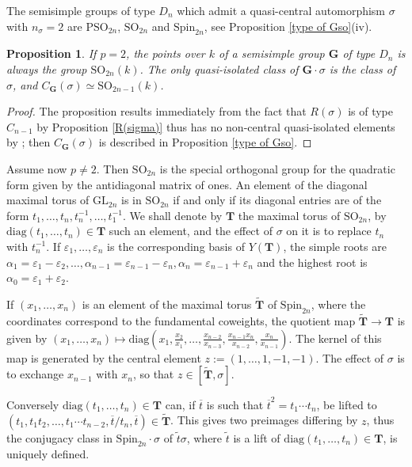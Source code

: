 \documentclass{amsart}
\newtheorem{proposition}[equation]{Proposition}
\numberwithin{equation}{section}
\theoremstyle{definition}
\theoremstyle{remark}
\newcommand\bG{{\mathbf G}}
\newcommand\bT{{\mathbf T}}
\newcommand\ve{{\varepsilon}}
\newcommand\inv{^{-1}}
\newcommand\GL{\mathrm{GL}}
\newcommand\PSO{\mathrm{PSO}}
\newcommand\SO{\mathrm{SO}}
\newcommand\Spin{\mathrm{Spin}}
\newcommand\diag{\mathrm{diag}}
\begin{document}
The semisimple groups of type $D_n$ which admit a quasi-central automorphism
$\sigma$ with $n_\sigma=2$ are $\PSO_{2n}$, $\SO_{2n}$ and $\Spin_{2n}$, see
Proposition \ref{type of Gso}(iv). 

\begin{proposition}
If $p=2$, the points over $k$ of a semisimple group $\bG$ of type $D_n$ is
always 
the group $\SO_{2n}(k)$. The only quasi-isolated class of $\bG\cdot\sigma$ is
the class of $\sigma$, and $C_\bG(\sigma)\simeq \SO_{2n-1}(k)$.
\end{proposition}
\begin{proof} The proposition results immediately from the fact that
$R(\sigma)$ is of type $C_{n-1}$ by Proposition \ref{R(sigma)} thus has no non-central
quasi-isolated elements by \cite[5.B.2]{cedric}; then $C_\bG(\sigma)$ is
described in Proposition \ref{type of Gso}.
\end{proof}

Assume now $p\neq2$. Then
$\SO_{2n}$ is the special orthogonal group for the quadratic form
given by the antidiagonal matrix of ones. An element of the diagonal maximal
torus of $\GL_{2n}$ is in $\SO_{2n}$ if and only if its diagonal entries
are of the form $t_1,\ldots,t_n,t_n\inv,\ldots,t_1\inv$. We shall denote by
$\bT$ the maximal torus of $\SO_{2n}$, by $\diag(t_1,\ldots,t_n)\in\bT$ such
an element, and the effect of $\sigma$ on it
is to replace $t_n$ with $t_n\inv$. If $\ve_1,\ldots,\ve_n$ is the
corresponding basis of $Y(\bT)$, the simple roots are
$\alpha_1=\ve_1-\ve_2,\ldots,\alpha_{n-1}=\ve_{n-1}-\ve_n,
\alpha_n=\ve_{n-1}+\ve_n$ and the highest root is $\alpha_0=\ve_1+\ve_2$.

If $(x_1,\ldots,x_n)$ is an element of the maximal torus $\tilde\bT$
of $\Spin_{2n}$,
where the coordinates correspond to the fundamental coweights, the quotient
map $\tilde\bT\to\bT$ is given by
$(x_1,\ldots,x_n)\mapsto\diag(x_1,\frac{x_2}{x_1},\ldots,
\frac{x_{n-2}}{x_{n-3}},\frac{x_{n-1}x_n}{x_{n-2}},\frac{x_n}{x_{n-1}})$.
The kernel of this map is generated by the central element
$z:=(1,\ldots,1,-1,-1)$. The effect of $\sigma$ is to exchange $x_{n-1}$ with
$x_n$, so that $z\in[\tilde\bT,\sigma]$.

Conversely $\diag(t_1,\ldots,t_n)\in\bT$ can,
if $\overline t$ is such that $\overline t^2=t_1\cdots t_n$,
be lifted to $(t_1,t_1t_2,\ldots,t_1\cdots t_{n-2},\overline t/t_n,\overline
t)\in\tilde\bT$. 
This gives two preimages differing by $z$,
thus the conjugacy class in $\Spin_{2n}\cdot\sigma$ of $\tilde t\sigma$, where
$\tilde t$ is a lift of $\diag(t_1,\ldots,t_n)\in\bT$, is uniquely defined.
\end{document}

